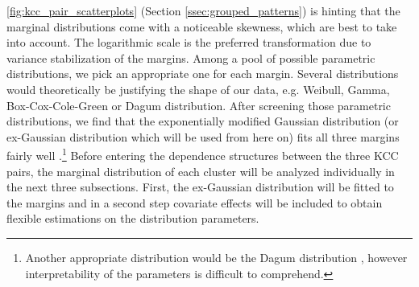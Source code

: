 
\autoref{fig:kcc_pair_scatterplots} (Section \ref{ssec:grouped_patterns}) is hinting that the marginal distributions come with a noticeable skewness, which are best to take into account. The logarithmic scale is the preferred transformation due to variance stabilization of the margins. Among a pool of possible parametric distributions, we pick an appropriate one for each margin. Several distributions would theoretically be justifying the shape of our data, e.g. Weibull, Gamma, Box-Cox-Cole-Green or Dagum distribution. After screening those parametric distributions, we find that the exponentially modified Gaussian distribution (or ex-Gaussian distribution which will be used from here on) fits all three margins fairly well \citep{grushka1972characterization}.\footnote{Another appropriate distribution would be the Dagum distribution \citep{dagum1975model}, however interpretability of the parameters is difficult to comprehend.} 
Before entering the dependence structures between the three \ac{KCC} pairs, the marginal distribution of each cluster will be analyzed individually in the next three subsections. First, the ex-Gaussian distribution will be fitted to the margins and in a second step covariate effects will be included to obtain flexible estimations on the distribution parameters.







